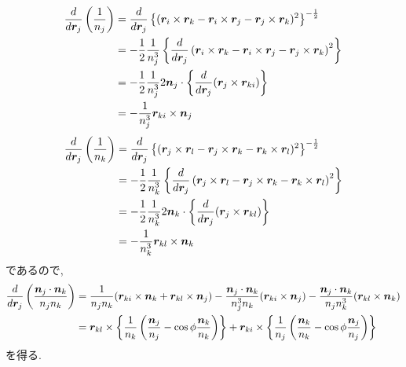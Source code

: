 \begin{align}
    \frac{d}{d \bm{r}_{j}} \left(\frac{1}{n_{j}} \right)
 &=
    \frac{d}{d \bm{r}_{j}}
    \left\{(  \bm{r}_{i} \times \bm{r}_{k}
            - \bm{r}_{i} \times \bm{r}_{j}
            - \bm{r}_{j} \times \bm{r}_{k} )^{2}
    \right\}^{-\frac{1}{2}}
 \notag
 \\
 &=
   -\frac{1}{2} \frac{1}{n_{j}^{3}}
    \left\{
           \frac{d}{d \bm{r}_{j}}
           \left(  \bm{r}_{i} \times \bm{r}_{k}
                 - \bm{r}_{i} \times \bm{r}_{j}
                 - \bm{r}_{j} \times \bm{r}_{k}
            \right)^{2}
    \right\}
 \notag
 \\
 &=
   - \frac{1}{2} \frac{1}{n_{j}^{3}}
    2\bm{n}_{j} \cdot
    \left\{
           \frac{d}{d \bm{r}_{j}} (\bm{r}_{j} \times \bm{r}_{ki})
    \right\}
 \notag
 \\
 &=
   - \frac{1}{n_{j}^{3}} \bm{r}_{ki} \times \bm{n}_{j}
\notag
\end{align}
\begin{align}
    \frac{d}{d \bm{r}_{j}} \left(\frac{1}{n_{k}} \right)
 &=
    \frac{d}{d \bm{r}_{j}}
    \left\{(  \bm{r}_{j} \times \bm{r}_{l}
            - \bm{r}_{j} \times \bm{r}_{k}
            - \bm{r}_{k} \times \bm{r}_{l} )^{2}
    \right\}^{-\frac{1}{2}}
 \notag
 \\
 &=
   -\frac{1}{2} \frac{1}{n_{k}^{3}}
    \left\{
           \frac{d}{d \bm{r}_{j}}
           \left(  \bm{r}_{j} \times \bm{r}_{l}
                 - \bm{r}_{j} \times \bm{r}_{k}
                 - \bm{r}_{k} \times \bm{r}_{l}
            \right)^{2}
    \right\}
 \notag
 \\
 &=
   - \frac{1}{2} \frac{1}{n_{k}^{3}}
    2\bm{n}_{k} \cdot
    \left\{
           \frac{d}{d \bm{r}_{j}} (\bm{r}_{j} \times \bm{r}_{kl})
    \right\}
 \notag
 \\
 &=
   - \frac{1}{n_{k}^{3}} \bm{r}_{kl} \times \bm{n}_{k}
\notag
\end{align}
であるので, 
\begin{align}
     \frac{d}{d \bm{r}_{j}}
     \left( \frac{\bm{n}_{j} \cdot \bm{n}_{k}} {n_{j} n_{k}} \right)
 &=
     \frac{1}{n_{j}n_{k}}
      (\bm{r}_{ki} \times \bm{n}_{k} + \bm{r}_{kl} \times \bm{n}_{j})
   - \frac{\bm{n}_{j} \cdot \bm{n}_{k}}{n_{j}^{3}n_{k}}
      (\bm{r}_{ki} \times \bm{n}_{j})
   - \frac{\bm{n}_{j} \cdot \bm{n}_{k}}{n_{j}n_{k}^{3}}
      (\bm{r}_{kl} \times \bm{n}_{k})
 \notag
 \\
 &=
     \bm{r}_{kl} \times
     \left\{
            \frac{1}{n_{k}}
            \left(
                   \frac{\bm{n}_{j}}{n_{j}} - \cos\phi \frac{\bm{n}_{k}}{n_{k}}
            \right)
     \right\}
   +
     \bm{r}_{ki} \times
     \left\{
            \frac{1}{n_{j}}
            \left(
                   \frac{\bm{n}_{k}}{n_{k}} - \cos\phi \frac{\bm{n}_{j}}{n_{j}}
            \right)
     \right\}
 \notag
\end{align}
を得る.
\\
